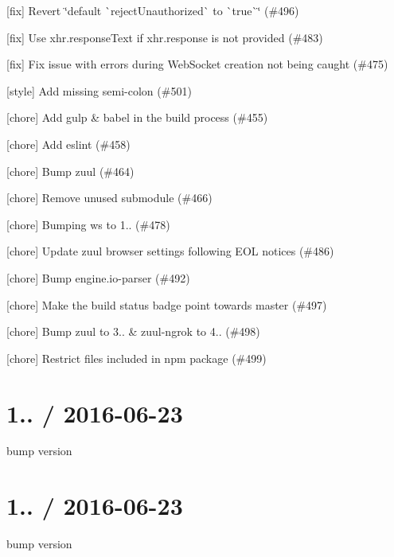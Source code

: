 \begin{DoxyItemize}
\item \mbox{[}fix\mbox{]} Revert \char`\"{}default \`{}reject\+Unauthorized\`{} to \`{}true\`{}\char`\"{} (\#496)
\item \mbox{[}fix\mbox{]} Use xhr.\+response\+Text if xhr.\+response is not provided (\#483)
\item \mbox{[}fix\mbox{]} Fix issue with errors during Web\+Socket creation not being caught (\#475)
\item \mbox{[}style\mbox{]} Add missing semi-\/colon (\#501)
\item \mbox{[}chore\mbox{]} Add gulp \& babel in the build process (\#455)
\item \mbox{[}chore\mbox{]} Add eslint (\#458)
\item \mbox{[}chore\mbox{]} Bump zuul (\#464)
\item \mbox{[}chore\mbox{]} Remove unused submodule (\#466)
\item \mbox{[}chore\mbox{]} Bumping ws to 1.. (\#478)
\item \mbox{[}chore\mbox{]} Update zuul browser settings following E\+OL notices (\#486)
\item \mbox{[}chore\mbox{]} Bump engine.\+io-\/parser (\#492)
\item \mbox{[}chore\mbox{]} Make the build status badge point towards master (\#497)
\item \mbox{[}chore\mbox{]} Bump zuul to 3.. \& zuul-\/ngrok to 4.. (\#498)
\item \mbox{[}chore\mbox{]} Restrict files included in npm package (\#499)
\end{DoxyItemize}

\section*{1.. / 2016-\/06-\/23 }


\begin{DoxyItemize}
\item bump version
\end{DoxyItemize}

\section*{1.. / 2016-\/06-\/23 }


\begin{DoxyItemize}
\item bump version
\end{DoxyItemize}

